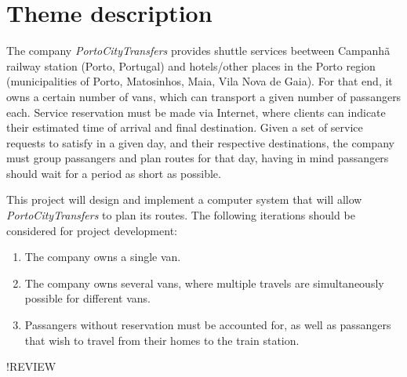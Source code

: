 \chapter{Theme description}
The company \emph{PortoCityTransfers} provides shuttle services beetween Campanhã railway station (Porto, Portugal) and hotels/other places in the Porto region (municipalities of Porto, Matosinhos, Maia, Vila Nova de Gaia). For that end, it owns a certain number of vans, which can transport a given number of passangers each. Service reservation must be made via Internet, where clients can indicate their estimated time of arrival and final destination. Given a set of service requests to satisfy in a given day, and their respective destinations, the company must group passangers and plan routes for that day, having in mind passangers should wait for a period as short as possible.\par
This project will design and implement a computer system that will allow \emph{PortoCityTransfers} to plan its routes. The following iterations should be considered for project development:
\begin{enumerate}
    \item The company owns a single van.
    \item The company owns several vans, where multiple travels are simultaneously possible for different vans.
    \item Passangers without reservation must be accounted for, as well as passangers that wish to travel from their homes to the train station.
\end{enumerate}
!REVIEW
